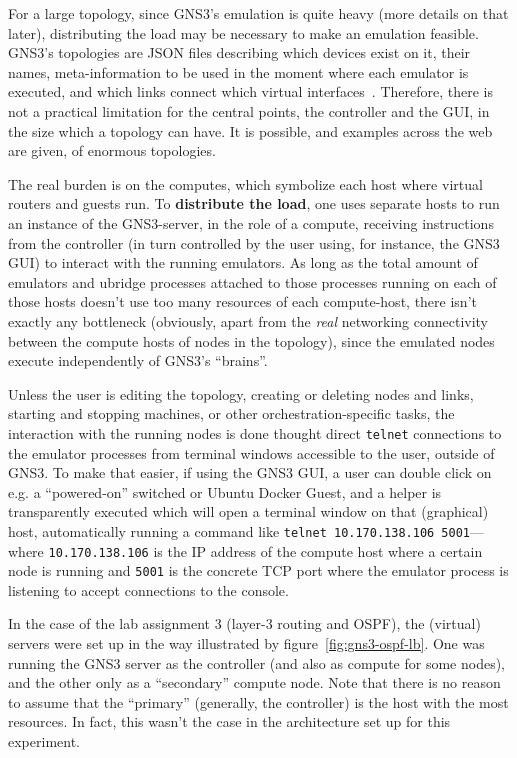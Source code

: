 For a large topology, since GNS3's emulation is quite heavy (more details on that later), distributing the load may be necessary to make an emulation feasible.
GNS3's topologies are JSON files describing which devices exist on it, their names, meta-information to be used in the moment where each emulator is executed, and which links connect which virtual interfaces~\cite{thebookofgns3}.
Therefore, there is not a practical limitation for the central points, the controller and the GUI, in the size which a topology can have.
It is possible, and examples across the web are given, of enormous topologies.

The real burden is on the computes, which symbolize each host where virtual routers and guests run.
To \textbf{distribute the load}, one uses separate hosts to run an instance of the GNS3-server, in the role of a compute, receiving instructions from the controller (in turn controlled by the user using, for instance, the GNS3 GUI) to interact with the running emulators.
As long as the total amount of emulators and ubridge processes attached to those processes running on each of those hosts doesn't use too many resources of each compute-host, there isn't exactly any bottleneck (obviously, apart from the \emph{real} networking connectivity between the compute hosts of nodes in the topology), since the emulated nodes execute independently of GNS3's ``brains''.

Unless the user is editing the topology, creating or deleting nodes and links, starting and stopping machines, or other orchestration-specific tasks, the interaction with the running nodes is done thought direct \texttt{telnet} connections to the emulator processes from terminal windows accessible to the user, outside of GNS3.
To make that easier, if using the GNS3 GUI, a user can double click on e.g. a ``powered-on'' switched or Ubuntu Docker Guest, and a helper is transparently executed which will open a terminal window on that (graphical) host, automatically running a command like \texttt{telnet 10.170.138.106 5001}---where \texttt{10.170.138.106} is the IP address of the compute host where a certain node is running and \texttt{5001} is the concrete TCP port where the emulator process is listening to accept connections to the console.

In the case of the lab assignment 3 (layer-3 routing and OSPF), the (virtual) servers were set up in the way illustrated by figure~\ref{fig:gns3-ospf-lb}.
One was running the GNS3 server as the controller (and also as compute for some nodes), and the other only as a ``secondary'' compute node.
Note that there is no reason to assume that the ``primary'' (generally, the controller) is the host with the most resources.
In fact, this wasn't the case in the architecture set up for this experiment.

